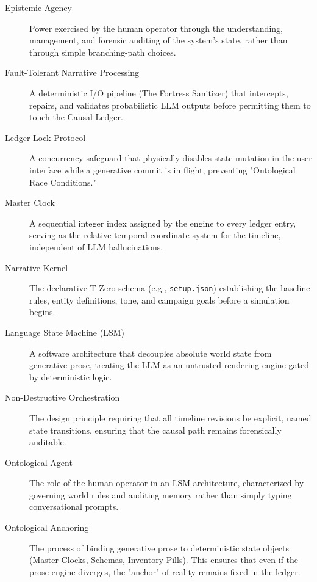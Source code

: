 \documentclass[12pt, a4paper]{article}
\begin{document}
\begin{description}
    \item[Epistemic Agency] \label{def:epistemic}
    Power exercised by the human operator through the understanding, management, and forensic auditing of the system’s state, rather than through simple branching-path choices.

    \item[Fault-Tolerant Narrative Processing] \label{def:fortress}
    A deterministic I/O pipeline (The Fortress Sanitizer) that intercepts, repairs, and validates probabilistic LLM outputs before permitting them to touch the Causal Ledger.

    \item[Ledger Lock Protocol] \label{def:lock}
    A concurrency safeguard that physically disables state mutation in the user interface while a generative commit is in flight, preventing "Ontological Race Conditions."

    \item[Master Clock] \label{def:mclock}
    A sequential integer index assigned by the engine to every ledger entry, serving as the relative temporal coordinate system for the timeline, independent of LLM hallucinations.

    \item[Narrative Kernel] \label{def:kernel}
    The declarative T-Zero schema (e.g., \texttt{setup.json}) establishing the baseline rules, entity definitions, tone, and campaign goals before a simulation begins.

    \item[Language State Machine (LSM)] \label{def:nsm}
    A software architecture that decouples absolute world state from generative prose, treating the LLM as an untrusted rendering engine gated by deterministic logic.

    \item[Non-Destructive Orchestration] \label{def:ndo}
    The design principle requiring that all timeline revisions be explicit, named state transitions, ensuring that the causal path remains forensically auditable.

    \item[Ontological Agent] \label{def:agent}
    The role of the human operator in an LSM architecture, characterized by governing world rules and auditing memory rather than simply typing conversational prompts.

    \item[Ontological Anchoring] \label{def:anchoring}
    The process of binding generative prose to deterministic state objects (Master Clocks, Schemas, Inventory Pills). This ensures that even if the prose engine diverges, the "anchor" of reality remains fixed in the ledger.


\end{description}
\end{document}
